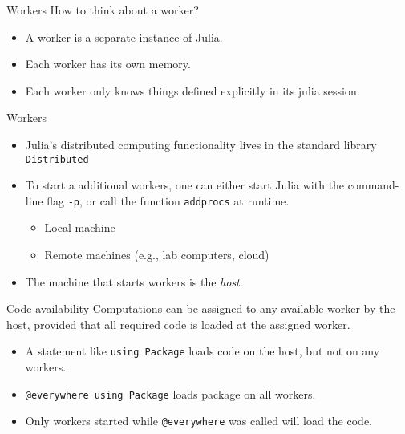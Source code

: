 \documentclass[10pt]{beamer}
\begin{document}
\begin{frame}{Workers}{}
	How to think about a worker?

	\begin{itemize}
		\item A worker is a separate instance of Julia.
		\item Each worker has its own memory.
		\item Each worker only knows things defined explicitly in its julia session.
	\end{itemize}
\end{frame}

\begin{frame}{Workers}{}
	\begin{itemize}
		\item Julia's distributed computing functionality lives in the standard library \href{https://docs.julialang.org/en/v1/stdlib/Distributed/}{\texttt{Distributed}}
		\item To start a additional workers, one can either start Julia with the command-line flag \texttt{-p}, or call the function \texttt{addprocs} at runtime.
		\begin{itemize}
			\item Local machine
			\item Remote machines (e.g., lab computers, cloud)
		\end{itemize}
		\item The machine that starts workers is the \emph{host}.
	\end{itemize}

\end{frame}
\begin{frame}{Code availability}{}
	Computations can be assigned to any available worker by the host, provided that all required code is loaded at the assigned worker.
	\begin{itemize}
		\item A statement like \texttt{using Package} loads code on the host, but not on any workers.
		\item \texttt{@everywhere using Package} loads package on all workers.
		\item Only workers started while \texttt{@everywhere} was called will load the code.
	\end{itemize}
\end{frame}
\end{document}
